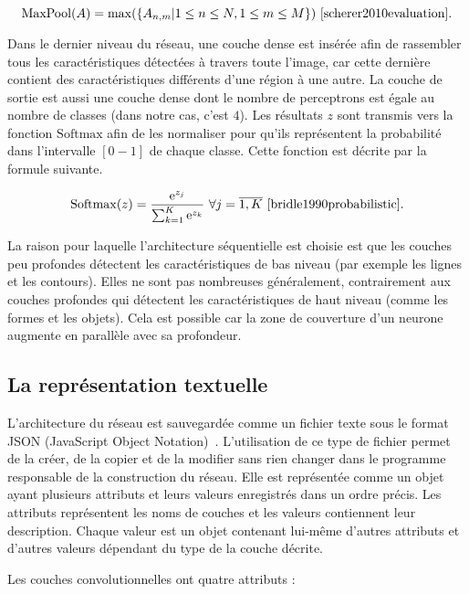 $$
\mathrm{MaxPool}(A) = \max(\{A_{n,m} | 1 \leq n \leq N, 1 \leq m \leq M\})~\cite{scherer2010evaluation}.
$$

Dans le dernier niveau du réseau, une couche dense est insérée afin de
rassembler tous les caractéristiques détectées à travers toute l'image, car cette
dernière contient des caractéristiques différents d'une région à une autre.
La couche de sortie est aussi une couche dense dont le nombre de perceptrons est
égale au nombre de classes (dans notre cas, c'est $4$). Les résultats $z$ sont
transmis vers la fonction $\mathrm{Softmax}$ afin de les normaliser pour
qu'ils représentent la probabilité dans l'intervalle $[0-1]$ de chaque classe.
Cette fonction est décrite par la formule suivante.

$$
\mathrm{Softmax}(z) = \frac{\mathrm{e}^{z_j}}{\sum^K_{k=1}\mathrm{e}^{z_k}}~\forall{j=\overline{1,K}}~\cite{bridle1990probabilistic}.
$$

La raison pour laquelle l'architecture séquentielle est choisie est que les
couches peu profondes détectent
les caractéristiques de bas niveau (par exemple les lignes et les contours). Elles
ne sont pas nombreuses généralement, contrairement aux couches profondes qui détectent
les caractéristiques de haut niveau (comme les formes et les objets).
Cela est possible car la zone de couverture d'un neurone
augmente en parallèle avec sa profondeur.~\cite{michael2015neural,Goodfellow-et-al-2016}

\subsection{La représentation textuelle}

L'architecture du réseau est sauvegardée comme un fichier texte sous le format
JSON (JavaScript Object Notation)~\cite{introducing2012ecma}.
L'utilisation de ce type de fichier
permet de la créer, de la copier et de la modifier sans rien changer dans le
programme responsable de la construction du réseau. Elle est représentée comme un objet
ayant plusieurs attributs et leurs valeurs enregistrés dans un ordre précis.
Les attributs représentent les noms de couches et les valeurs contiennent
leur description. Chaque valeur est un objet contenant lui-même d'autres attributs
et d'autres valeurs dépendant du type de la couche décrite.

Les couches convolutionnelles ont quatre attributs :

